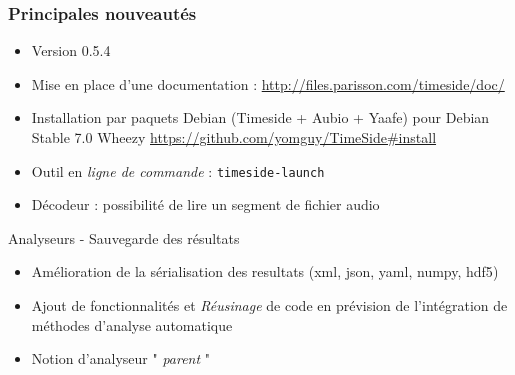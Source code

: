 \documentclass[10pt, final, hyperref, table]{beamer}
\begin{document}
\begin{frame}
  \frametitle{Principales nouveautés}
  \begin{block}{}
    \begin{itemize}
    \item Version 0.5.4 
    \item Mise en place d'une documentation :
      \url{http://files.parisson.com/timeside/doc/}
   
    \item Installation par paquets Debian (Timeside + Aubio + Yaafe)
      pour Debian Stable 7.0 Wheezy
      \url{https://github.com/yomguy/TimeSide\#install}
    \item Outil en \emph{ligne de commande} : \texttt{timeside-launch}
    \item Décodeur : possibilité de lire un \alert{segment} de fichier audio
    \end{itemize}
  \end{block}
  \begin{block}{Analyseurs - Sauvegarde des résultats}
    \begin{itemize}
    \item Amélioration de la sérialisation des resultats (xml, json,
      yaml, \alert{numpy}, \alert{hdf5})
    \item  Ajout de fonctionnalités et \emph{Réusinage} de code en prévision de l'intégration de méthodes d'analyse automatique
    \item Notion d'analyseur " \emph{parent} "
    \end{itemize}
    
  \end{block}
\end{frame}
\end{document}
